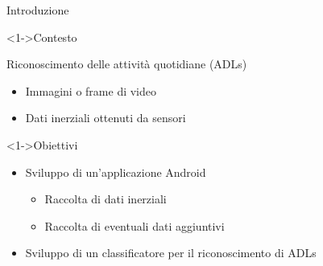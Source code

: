 \begin{tframe}{Introduzione}

    \begin{block}<1->{Contesto}
    
        Riconoscimento delle attività quotidiane (ADLs)

        \begin{itemize}
            \item Immagini o frame di video
            \item Dati inerziali ottenuti da sensori
        \end{itemize}

    \end{block}

    \begin{block}<1->{Obiettivi}
        
        \begin{itemize}
            \item Sviluppo di un'applicazione Android \begin{itemize}
                \item Raccolta di dati inerziali
                \item Raccolta di eventuali dati aggiuntivi
            \end{itemize}
            \item Sviluppo di un classificatore per il riconoscimento di ADLs
        \end{itemize}
        
    \end{block}

\end{tframe}